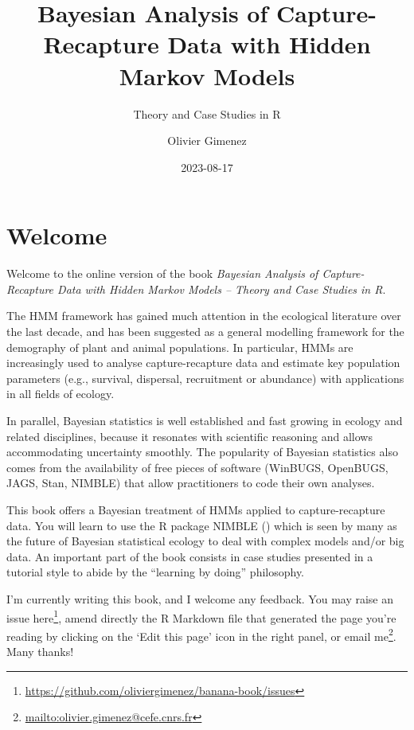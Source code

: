 \documentclass[
  12pt,
]{krantz}
\title{Bayesian Analysis of Capture-Recapture Data with Hidden Markov Models}
\subtitle{Theory and Case Studies in R}
\author{Olivier Gimenez}
\date{2023-08-17}
\renewcommand{\href}[2]{#2\footnote{\url{#1}}}
\begin{document}
\maketitle

\thispagestyle{empty}

\setlength{\abovedisplayskip}{-5pt}
\setlength{\abovedisplayshortskip}{-5pt}

{
\hypersetup{linkcolor=}
\setcounter{tocdepth}{2}
\tableofcontents
}
\listoffigures
\listoftables
\hypertarget{welcome}{%
\chapter*{Welcome}\label{welcome}}


Welcome to the online version of the book \emph{Bayesian Analysis of Capture-Recapture Data with Hidden Markov Models -- Theory and Case Studies in R}.

The HMM framework has gained much attention in the ecological literature over the last decade, and has been suggested as a general modelling framework for the demography of plant and animal populations. In particular, HMMs are increasingly used to analyse capture-recapture data and estimate key population parameters (e.g., survival, dispersal, recruitment or abundance) with applications in all fields of ecology.

In parallel, Bayesian statistics is well established and fast growing in ecology and related disciplines, because it resonates with scientific reasoning and allows accommodating uncertainty smoothly. The popularity of Bayesian statistics also comes from the availability of free pieces of software (WinBUGS, OpenBUGS, JAGS, Stan, NIMBLE) that allow practitioners to code their own analyses.

This book offers a Bayesian treatment of HMMs applied to capture-recapture data. You will learn to use the R package NIMBLE (\citet{deValpine2017}) which is seen by many as the future of Bayesian statistical ecology to deal with complex models and/or big data. An important part of the book consists in case studies presented in a tutorial style to abide by the ``learning by doing'' philosophy.

I'm currently writing this book, and I welcome any feedback. You may raise an issue \href{https://github.com/oliviergimenez/banana-book/issues}{here}, amend directly the R Markdown file that generated the page you're reading by clicking on the `Edit this page' icon in the right panel, or \href{mailto:olivier.gimenez@cefe.cnrs.fr}{email me}. Many thanks!
\end{document}
